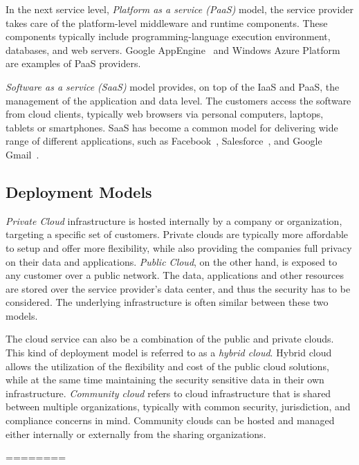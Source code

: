 In the next service level, \emph{Platform as a service (PaaS)} model, the service provider takes care of the platform-level middleware and runtime components. These components typically include programming-language execution environment, databases, and web servers. Google AppEngine~\cite{Sanderson:2009:GoogleAppEngine} and Windows Azure Platform~\cite{Redkar:2011:Azure} are examples of PaaS providers.~\cite{Mell:2011:ccdef}

\emph{Software as a service (SaaS)} model provides, on top of the IaaS and PaaS, the management of the application and data level. The customers access the software from cloud clients, typically web browsers via personal computers, laptops, tablets or smartphones. SaaS has become a common model for delivering wide range of different applications, such as Facebook~\cite{facebook}, Salesforce~\cite{salesforce}, and Google Gmail~\cite{Teeter:2011:Gmail}.~\cite{Mell:2011:ccdef}

\subsection{Deployment Models}
\emph{Private Cloud} infrastructure is hosted internally by a company or organization, targeting a specific set of customers. Private clouds are typically more affordable to setup and offer more flexibility, while also providing the companies full privacy on their data and applications. \emph{Public Cloud}, on the other hand, is exposed to any customer over a public network. The data, applications and other resources are stored over the service provider's data center, and thus the security has to be considered. The underlying infrastructure is often similar between these two models.~\cite{Mell:2011:ccdef}

The cloud service can also be a combination of the public and private clouds. This kind of deployment model is referred to as a \emph{hybrid cloud}. Hybrid cloud allows the utilization of the flexibility and cost of the public cloud solutions, while at the same time maintaining the security sensitive data in their own infrastructure. \emph{Community cloud} refers to cloud infrastructure that is shared between multiple organizations, typically with common security, jurisdiction, and compliance concerns in mind. Community clouds can be hosted and managed either internally or externally from the sharing organizations.~\cite{Mell:2011:ccdef}

========



